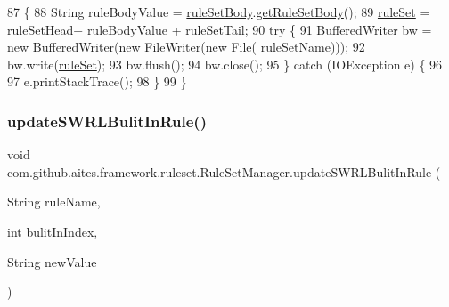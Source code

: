 \begin{DoxyCode}
87                              \{
88         String ruleBodyValue = \mbox{\hyperlink{classcom_1_1github_1_1aites_1_1framework_1_1ruleset_1_1_rule_set_manager_a2218521e8abc1048bd369c7ed1c14c60}{ruleSetBody}}.\mbox{\hyperlink{classcom_1_1github_1_1aites_1_1framework_1_1ruleset_1_1_rule_set_body_a1dc9e518f7c37c11345a96eeff9136fc}{getRuleSetBody}}();
89         \mbox{\hyperlink{classcom_1_1github_1_1aites_1_1framework_1_1ruleset_1_1_rule_set_manager_a91929018d0cdd9df1eed93f8f07cb77e}{ruleSet}} = \mbox{\hyperlink{classcom_1_1github_1_1aites_1_1framework_1_1ruleset_1_1_rule_set_manager_ae9d272c4520c18f269ac835e83be526f}{ruleSetHead}}+ ruleBodyValue + \mbox{\hyperlink{classcom_1_1github_1_1aites_1_1framework_1_1ruleset_1_1_rule_set_manager_a6696dfa261a4ccc23236373f8d33b316}{ruleSetTail}};
90         \textcolor{keywordflow}{try} \{
91             BufferedWriter bw = \textcolor{keyword}{new} BufferedWriter(\textcolor{keyword}{new} FileWriter(\textcolor{keyword}{new} File(
      \mbox{\hyperlink{classcom_1_1github_1_1aites_1_1framework_1_1ruleset_1_1_rule_set_manager_aeb9d61ae7f558514e41f5ed18b00a56e}{ruleSetName}})));
92             bw.write(\mbox{\hyperlink{classcom_1_1github_1_1aites_1_1framework_1_1ruleset_1_1_rule_set_manager_a91929018d0cdd9df1eed93f8f07cb77e}{ruleSet}});
93             bw.flush();
94             bw.close();
95         \} \textcolor{keywordflow}{catch} (IOException e) \{
96     
97             e.printStackTrace();
98         \}
99     \}
\end{DoxyCode}
\mbox{\label{classcom_1_1github_1_1aites_1_1framework_1_1ruleset_1_1_rule_set_manager_ab43e7407d6c856bfd5adbccd71a39b8a}} 
\subsubsection{\texorpdfstring{update\+S\+W\+R\+L\+Bulit\+In\+Rule()}{updateSWRLBulitInRule()}}
{\footnotesize\ttfamily void com.\+github.\+aites.\+framework.\+ruleset.\+Rule\+Set\+Manager.\+update\+S\+W\+R\+L\+Bulit\+In\+Rule (\begin{DoxyParamCaption}\item[{String}]{rule\+Name,  }\item[{int}]{bulit\+In\+Index,  }\item[{String}]{new\+Value }\end{DoxyParamCaption})}




